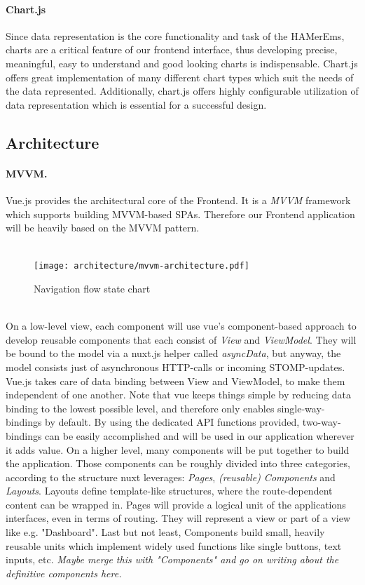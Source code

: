\documentclass{scrreprt}
\begin{document}
\paragraph{Chart.js} Since data representation is the core functionality and task of the HAMerEms, charts are a critical feature of our frontend interface, thus developing precise, meaningful, easy to understand and good looking charts is indispensable. Chart.js offers great implementation of many different chart types which suit the needs of the data represented. Additionally, chart.js offers highly configurable utilization of data representation which is essential for a successful design.
\subsection{Architecture}
\paragraph{MVVM.} Vue.js provides the architectural core of the Frontend. It is a \emph{MVVM}
framework which supports building MVVM-based SPAs. Therefore our Frontend application will be
heavily based on the MVVM pattern.
\\ \\ 	
\begin{figure}[h]
	\centering
	\texttt{[image: architecture/mvvm-architecture.pdf]}
	\caption{Navigation flow state chart}
	\label{MVVM}
\end{figure}
\\
On a low-level view, each component will use vue's component-based approach to develop
reusable components that each consist of \emph{View} and \emph{ViewModel}. They will be bound
to the model via a nuxt.js helper called \emph{asyncData}, but anyway, the model consists 
just of asynchronous HTTP-calls or incoming STOMP-updates. Vue.js takes
care of data binding between View and ViewModel, to make them independent of one another.
Note that vue keeps things simple by reducing data binding to the lowest possible level, and therefore only enables single-way-bindings by default. By using the dedicated
API functions provided, two-way-bindings can be easily accomplished and will be used in our
application wherever it adds value.
On a higher level, many components will be put together to build the application. Those components
can be roughly divided into three categories, according to the structure nuxt leverages:
\emph{Pages}, \emph{(reusable) Components} and \emph{Layouts}.
Layouts define template-like structures, where the route-dependent content can be wrapped in.
Pages will provide a logical unit of the applications interfaces, even in terms of routing.
They will represent a view or part of a view like e.g. "Dashboard".
Last but not least, Components build small, heavily reusable units which implement widely used
functions like single buttons, text inputs, etc.
\emph{Maybe merge this with "Components" and go on writing about the definitive components here.}
\end{document}
